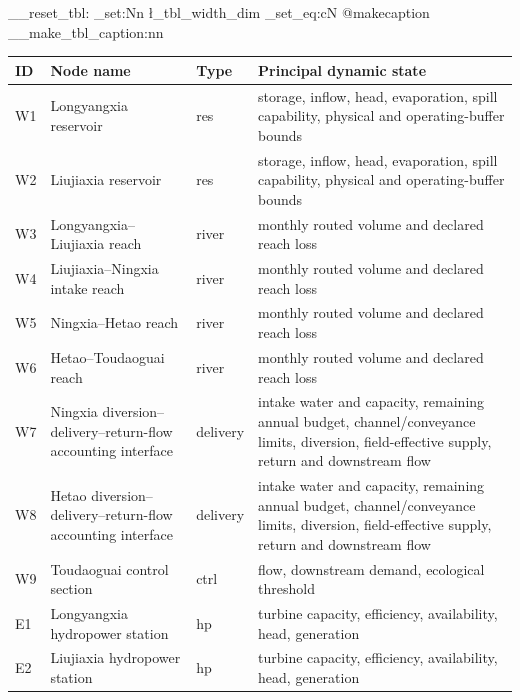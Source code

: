 \documentclass [a4paper,fleqn] {cas-dc}
\begin{document}
\noindent\begin{minipage}{\textwidth}
\makeatletter{}\makeatother
\ExplSyntaxOn
\__reset_tbl:
\dim_set:Nn \l_tbl_width_dim { \linewidth }
\cs_set_eq:cN { @makecaption } \__make_tbl_caption:nn
\ExplSyntaxOff
\caption{Registry of the 24 graph entities and their principal dynamic states.}
\label{tab:definitions}
\centering
\sffamily\footnotesize
\setlength{\tabcolsep}{4pt}
\renewcommand{\arraystretch}{1.04}
\begin{tabularx}{\textwidth}{@{}l >{\raggedright\arraybackslash}p{} l
  >{\raggedright\arraybackslash}X@{}}
\toprule
ID & Node name & Type & Principal dynamic state \\
\midrule
W1 & Longyangxia reservoir & res & storage, inflow, head, evaporation, spill capability, physical and operating-buffer bounds \\
W2 & Liujiaxia reservoir & res & storage, inflow, head, evaporation, spill capability, physical and operating-buffer bounds \\
W3 & Longyangxia--Liujiaxia reach & river & monthly routed volume and declared reach loss \\
W4 & Liujiaxia--Ningxia intake reach & river & monthly routed volume and declared reach loss \\
W5 & Ningxia--Hetao reach & river & monthly routed volume and declared reach loss \\
W6 & Hetao--Toudaoguai reach & river & monthly routed volume and declared reach loss \\
W7 & Ningxia diversion--delivery--return-flow accounting interface & delivery & intake water and capacity, remaining annual budget, channel/conveyance limits, diversion, field-effective supply, return and downstream flow \\
W8 & Hetao diversion--delivery--return-flow accounting interface & delivery & intake water and capacity, remaining annual budget, channel/conveyance limits, diversion, field-effective supply, return and downstream flow \\
W9 & Toudaoguai control section & ctrl & flow, downstream demand, ecological threshold \\
\midrule
E1 & Longyangxia hydropower station & hp & turbine capacity, efficiency, availability, head, generation \\
E2 & Liujiaxia hydropower station & hp & turbine capacity, efficiency, availability, head, generation \\

\end{tabularx}
\end{minipage}
\end{document}
